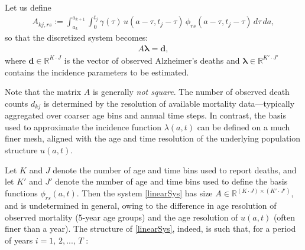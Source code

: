 \documentclass{article}
\def\blambda{\boldsymbol{\lambda}}
\def\bd{\boldsymbol{d}}
\begin{document}
Let us define
\begin{align}
A_{kj, rs} := \int_{a_k}^{a_{k+1}} \int_0^{t_j} \gamma(\tau)\, u(a - \tau, t_j - \tau)\, \phi_{rs}(a - \tau, t_j - \tau)\, d\tau\, da,
\end{align}
so that the discretized system becomes:
\begin{align}\label{linearSys}
A \blambda = \bd,
\end{align}
where $\bd \in \mathbb{R}^{K\cdot J}$ is the vector of observed Alzheimer’s deaths and $\blambda \in \mathbb{R}^{K'\cdot J'}$ contains the incidence parameters to be estimated. 

\par Note that the matrix $A$ is generally \emph{not square}. The number of observed death counts $d_{kj}$ is determined by the resolution of available mortality data—typically aggregated over coarser age bins and annual time steps. In contrast, the basis used to approximate the incidence function $\lambda(a,t)$ can be defined on a much finer mesh, aligned with the age and time resolution of the underlying population structure $u(a,t)$. 

Let $K$ and $J$ denote the number of age and time bins used to report deaths, and let $K'$ and $J'$ denote the number of age and time bins used to define the basis functions $\phi_{rs}(a,t)$. Then the system \eqref{linearSys} has size $A \in \mathbb{R}^{(K \cdot J) \times (K' \cdot J')}$, and is undetermined in general, owing to the difference in age resolution of observed mortality (5-year age groups) and the age resolution of $u(a,t)$ (often finer than a year). 
The structure of \eqref{linearSys}, indeed, is such that, for a period of years $i=1,\,2,...,\,T$ :
\end{document}
